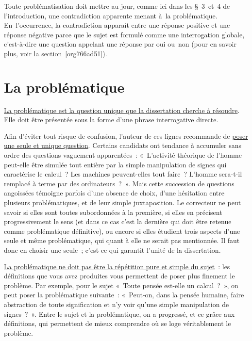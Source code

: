 \documentclass[a4paper,12pt]{report}
\begin{document}
Toute problématisation doit mettre au jour, comme ici dans les § 3 et 4
de l'introduction, une contradiction apparente menant à la
problématique. En l'occurrence, la contradiction apparaît entre une
réponse positive et une réponse négative parce que le sujet est formulé
comme une interrogation globale, c'est-à-dire une question appelant une
réponse par oui ou non (pour en savoir plus, voir la section \ref{org766ad51}).


\section{La problématique}
\label{sec:org629f6aa}

\uline{La problématique est la question unique que la dissertation cherche à
résoudre}. Elle doit être présentée sous la forme d'une phrase
interrogative directe.

Afin d'éviter tout risque de confusion, l'auteur de ces lignes
recommande de \uline{poser une seule et unique question}. Certains candidats
ont tendance à accumuler sans ordre des questions vaguement
apparentées : « L'activité théorique de l'homme peut-elle être simulée
tout entière par la simple manipulation de signes qui caractérise le
calcul ? Les machines peuvent-elles tout faire ? L'homme sera-t-il
remplacé à terme par des ordinateurs ? ». Mais cette succession de
questions angoissées témoigne parfois d'une absence de choix, d'une
hésitation entre plusieurs problématiques, et de leur simple
juxtaposition. Le correcteur ne peut savoir si elles sont toutes
subordonnées à la première, si elles en précisent progressivement le
sens (et dans ce cas c'est la dernière qui doit être retenue comme
problématique définitive), ou encore si elles étudient trois aspects
d'une seule et même problématique, qui quant à elle ne serait pas
mentionnée. Il faut donc en choisir une seule ; c'est ce qui garantit
l'unité de la dissertation.

\uline{La problématique ne doit pas être la répétition pure et simple du
sujet} : les définitions que vous avez produites vous permettent de
poser plus finement le problème. Par exemple, pour le sujet « Toute
pensée est-elle un calcul ? », on peut poser la problématique suivante :
« Peut-on, dans la pensée humaine, faire abstraction de toute
signification et n'y voir qu'une simple manipulation de signes ? ».
Entre le sujet et la problématique, on a progressé, et ce grâce aux
définitions, qui permettent de mieux comprendre où se loge véritablement
le problème.
\end{document}
